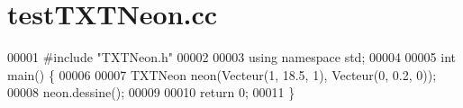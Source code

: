 \section{test\+T\+X\+T\+Neon.\+cc}
\label{test_t_x_t_neon_8cc_source}

\begin{DoxyCode}
00001 \textcolor{preprocessor}{#include "TXTNeon.h"}
00002 
00003 \textcolor{keyword}{using namespace }std;
00004 
00005 \textcolor{keywordtype}{int} main() \{
00006     
00007     TXTNeon neon(Vecteur(1, 18.5, 1), Vecteur(0, 0.2, 0));
00008     neon.dessine();
00009     
00010     \textcolor{keywordflow}{return} 0;
00011 \}
\end{DoxyCode}
